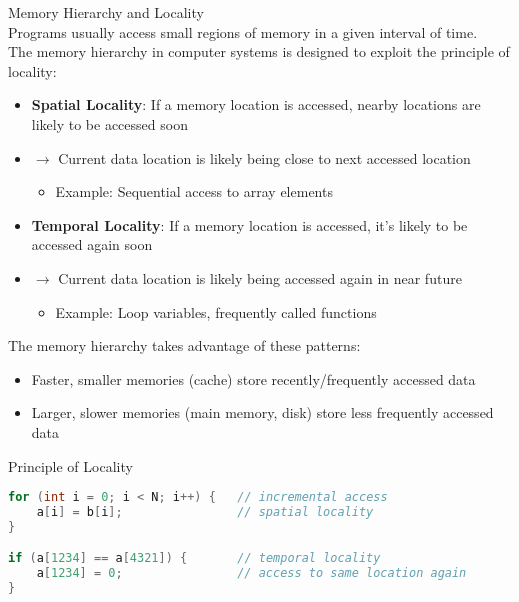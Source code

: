 \begin{concept}{Memory Hierarchy and Locality}\\
Programs usually access small regions of memory in a given interval of time. \\
The memory hierarchy in computer systems is designed to exploit the principle of locality:
\begin{itemize}
    \item \textbf{Spatial Locality}: If a memory location is accessed, nearby locations are likely to be accessed soon
    \item $\rightarrow$ Current data location is likely being close to next accessed location
    \begin{itemize}
        \item Example: Sequential access to array elements
    \end{itemize}
    \item \textbf{Temporal Locality}: If a memory location is accessed, it's likely to be accessed again soon
    \item $\rightarrow$ Current data location is likely being accessed again in near future
    \begin{itemize}
        \item Example: Loop variables, frequently called functions
    \end{itemize}
\end{itemize}
The memory hierarchy takes advantage of these patterns:
\begin{itemize}
    \item Faster, smaller memories (cache) store recently/frequently accessed data
    \item Larger, slower memories (main memory, disk) store less frequently accessed data
\end{itemize}
\end{concept}

\begin{code}{Principle of Locality}
\begin{lstlisting}[language=C, style=basesmol]
for (int i = 0; i < N; i++) {   // incremental access
    a[i] = b[i];                // spatial locality
}

if (a[1234] == a[4321]) {       // temporal locality
    a[1234] = 0;                // access to same location again
} 
\end{lstlisting}  
\end{code}

